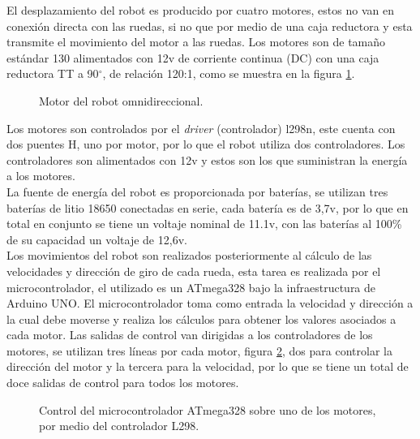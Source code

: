 \documentclass{iccmemoria}
\begin{document}
El desplazamiento del robot es producido por cuatro motores, estos no van en conexión directa con las ruedas, si no que por medio de una caja reductora y esta transmite el movimiento del motor a las ruedas. Los motores son de tamaño estándar 130 alimentados con 12v de corriente continua (DC) con una caja reductora TT a 90$^{\circ}$, de relación 120:1, como se muestra en la figura \ref{fig:motor}.\\

\begin{figure}[H]
  \centering
  
  \caption{Motor del robot omnidireccional.}
  \label{fig:motor}
\end{figure}

Los motores son controlados por el \emph{driver} (controlador) l298n, este cuenta con dos puentes H, uno por motor, por lo que el robot utiliza dos controladores. Los controladores son alimentados con 12v y estos son los que suministran la energía a los motores.\\

La fuente de energía del robot es proporcionada por baterías, se utilizan tres baterías de litio 18650 conectadas en serie, cada batería es de 3,7v, por lo que en total en conjunto se tiene un voltaje nominal de 11.1v, con las baterías al 100\% de su capacidad un voltaje de 12,6v.\\

Los movimientos del robot son realizados posteriormente al cálculo de las velocidades y dirección de giro de cada rueda, esta tarea es realizada por el microcontrolador, el utilizado es un ATmega328 bajo la infraestructura de Arduino UNO. El microcontrolador toma como entrada la velocidad y dirección a la cual debe moverse y realiza los cálculos para obtener los valores asociados a cada motor. Las salidas de control van dirigidas a los controladores de los motores, se utilizan tres líneas por cada motor, figura \ref{fig:ATmega328_L298}, dos para controlar la dirección del motor y la tercera para la velocidad, por lo que se tiene un total de doce salidas de control para todos los motores.\\

\begin{figure}[H]
  \centering
  \selectfont{
  
  }
  \caption{Control del microcontrolador ATmega328 sobre uno de los motores, por medio del controlador L298.}
  \label{fig:ATmega328_L298}
\end{figure}
\end{document}
